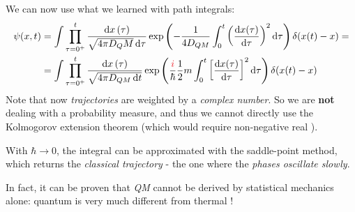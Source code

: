 \documentclass[../template.tex]{subfiles}
\begin{document}
We can now use what we learned with path integrals:
\begin{align*}
    \psi(x,t) &= \int \prod_{\tau = 0^+}^t \frac{\dd{x}(\tau)}{\sqrt{4 \pi D_
    QM} \dd{\tau}} \exp\left(-\frac{1}{4 D_{QM}} \int_0^t \left(\dv{x(\tau)}{\tau}\right)^2 \dd{\tau} \right) \delta(x(t)-x) =\\
&= \int \prod_{\tau = 0^+}^t \frac{\dd{x}(\tau)}{\sqrt{4 \pi D_{QM} \dd{t}}} \exp\left(\frac{\textcolor{Red}{i}}{\hbar} \frac{1}{2}m \int_0^t \left[\dv{x(\tau)}{\tau}\right]^2 \dd{\tau} \right) \delta(x(t)-x)
\end{align*}
Note that now \textit{trajectories} are weighted by a \textit{complex number}. So we are \textbf{not} dealing with a probability measure, and thus we cannot directly use the Kolmogorov extension theorem (which would require non-negative real ).

With $\hbar \to 0$, the integral can be approximated with the saddle-point method, which returns the \textit{classical trajectory} - the one where the \textit{phases oscillate slowly}.

In fact, it can be proven that \textit{QM} cannot be derived by statistical mechanics alone: quantum  is very much different from thermal !
\end{document}
